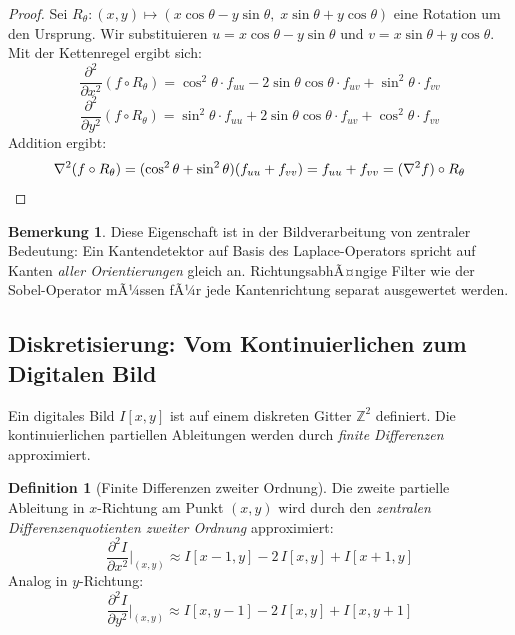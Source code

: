 ﻿\documentclass[a4paper,12pt]{article}
\theoremstyle{definition}
\newtheorem{definition}{Definition}
\newtheorem{bemerkung}{Bemerkung}
\begin{document}
\begin{proof}
    Sei $R_\theta: (x,y) \mapsto (x\cos\theta - y\sin\theta,\; x\sin\theta + y\cos\theta)$
    eine Rotation um den Ursprung. Wir substituieren
    $u = x\cos\theta - y\sin\theta$ und $v = x\sin\theta + y\cos\theta$.
    Mit der Kettenregel ergibt sich:
    \[
        \frac{\partial^2}{\partial x^2}(f \circ R_\theta)
        = \cos^2\theta \cdot f_{uu} - 2\sin\theta\cos\theta \cdot f_{uv} + \sin^2\theta \cdot f_{vv}
    \]
    \[
        \frac{\partial^2}{\partial y^2}(f \circ R_\theta)
        = \sin^2\theta \cdot f_{uu} + 2\sin\theta\cos\theta \cdot f_{uv} + \cos^2\theta \cdot f_{vv}
    \]
    Addition ergibt:
    \[
        \nabla^2(f \circ R_\theta)
        = (\cos^2\theta + \sin^2\theta)(f_{uu} + f_{vv})
        = f_{uu} + f_{vv}
        = (\nabla^2 f) \circ R_\theta \qedhere
    \]
\end{proof}

\begin{bemerkung}
    Diese Eigenschaft ist in der Bildverarbeitung von zentraler Bedeutung: Ein Kantendetektor auf
    Basis des Laplace-Operators spricht auf Kanten \emph{aller Orientierungen} gleich an. RichtungsabhÃ¤ngige
    Filter wie der Sobel-Operator mÃ¼ssen fÃ¼r jede Kantenrichtung separat ausgewertet werden.
\end{bemerkung}

\subsection{Diskretisierung: Vom Kontinuierlichen zum Digitalen Bild}

Ein digitales Bild $I[x,y]$ ist auf einem diskreten Gitter $\mathbb{Z}^2$ definiert. Die
kontinuierlichen partiellen Ableitungen werden durch \emph{finite Differenzen} approximiert.

\begin{definition}[Finite Differenzen zweiter Ordnung]
    Die zweite partielle Ableitung in $x$-Richtung am Punkt $(x,y)$ wird durch den
    \emph{zentralen Differenzenquotienten zweiter Ordnung} approximiert:
    \[
        \frac{\partial^2 I}{\partial x^2}\bigg|_{(x,y)}
        \approx I[x-1,y] - 2\,I[x,y] + I[x+1,y]
    \]
    Analog in $y$-Richtung:
    \[
        \frac{\partial^2 I}{\partial y^2}\bigg|_{(x,y)}
        \approx I[x,y-1] - 2\,I[x,y] + I[x,y+1]
    \]
\end{definition}
\end{document}
